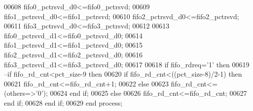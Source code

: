 \begin{DoxyCode}
00608             \textcolor{vhdlchar}{fifo0_pctrsvd_d0}\textcolor{vhdlchar}{<=}\textcolor{vhdlchar}{fifo0_pctrsvd};
00609             \textcolor{vhdlchar}{fifo1_pctrsvd_d0}\textcolor{vhdlchar}{<=}\textcolor{vhdlchar}{fifo1_pctrsvd};
00610             \textcolor{vhdlchar}{fifo2_pctrsvd_d0}\textcolor{vhdlchar}{<=}\textcolor{vhdlchar}{fifo2_pctrsvd};
00611             \textcolor{vhdlchar}{fifo3_pctrsvd_d0}\textcolor{vhdlchar}{<=}\textcolor{vhdlchar}{fifo3_pctrsvd};
00612             
00613             \textcolor{vhdlchar}{fifo0_pctrsvd_d1}\textcolor{vhdlchar}{<=}\textcolor{vhdlchar}{fifo0_pctrsvd_d0};
00614             \textcolor{vhdlchar}{fifo1_pctrsvd_d1}\textcolor{vhdlchar}{<=}\textcolor{vhdlchar}{fifo1_pctrsvd_d0};
00615             \textcolor{vhdlchar}{fifo2_pctrsvd_d1}\textcolor{vhdlchar}{<=}\textcolor{vhdlchar}{fifo2_pctrsvd_d0};
00616             \textcolor{vhdlchar}{fifo3_pctrsvd_d1}\textcolor{vhdlchar}{<=}\textcolor{vhdlchar}{fifo3_pctrsvd_d0};
00617             
00618           \textcolor{keywordflow}{if} \textcolor{vhdlchar}{fifo_rdreq}\textcolor{vhdlchar}{=}\textcolor{vhdlchar}{'}\textcolor{vhdllogic}{}\textcolor{vhdllogic}{1}\textcolor{vhdlchar}{'} \textcolor{keywordflow}{then} 
00619 \textcolor{keyword}{              --if fifo\_rd\_cnt<pct\_size-9 then }
00620               \textcolor{keywordflow}{if} \textcolor{vhdlchar}{fifo_rd_cnt}\textcolor{vhdlchar}{<}\textcolor{vhdlchar}{(}\textcolor{vhdlchar}{(}\textcolor{vhdlchar}{pct_size}\textcolor{vhdlchar}{-}\textcolor{vhdllogic}{}\textcolor{vhdllogic}{8}\textcolor{vhdlchar}{)}\textcolor{vhdlchar}{/}\textcolor{vhdllogic}{2-1}\textcolor{vhdlchar}{)} \textcolor{keywordflow}{then} 
00621                   \textcolor{vhdlchar}{fifo_rd_cnt}\textcolor{vhdlchar}{<=}\textcolor{vhdlchar}{fifo_rd_cnt}\textcolor{vhdlchar}{+}\textcolor{vhdllogic}{}\textcolor{vhdllogic}{1};
00622               \textcolor{keywordflow}{else} 
00623                   \textcolor{vhdlchar}{fifo_rd_cnt}\textcolor{vhdlchar}{<=}\textcolor{vhdlchar}{(}\textcolor{keywordflow}{others}\textcolor{vhdlchar}{=}\textcolor{vhdlchar}{>}\textcolor{vhdlchar}{'}\textcolor{vhdllogic}{}\textcolor{vhdllogic}{0}\textcolor{vhdlchar}{'}\textcolor{vhdlchar}{)};
00624               \textcolor{keywordflow}{end} \textcolor{keywordflow}{if};
00625           \textcolor{keywordflow}{else} 
00626               \textcolor{vhdlchar}{fifo_rd_cnt}\textcolor{vhdlchar}{<=}\textcolor{vhdlchar}{fifo_rd_cnt};
00627           \textcolor{keywordflow}{end} \textcolor{keywordflow}{if};
00628         \textcolor{keywordflow}{end} \textcolor{keywordflow}{if};
00629     \textcolor{keywordflow}{end} \textcolor{keywordflow}{process};

\end{DoxyCode}
